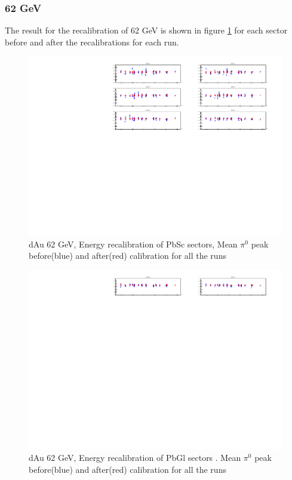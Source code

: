 \documentclass{article}
\begin{document}
\subsubsection{62 GeV}
The result for the recalibration of 62 GeV is shown in figure \ref{recalib62GeV} for each sector before and after the recalibrations for each run.
\begin{figure}
    \centering
    \includegraphics[width=1\textwidth]{fig_pi0vn/nocalib_vs_calib_sector1_6.pdf}
    \caption{dAu 62 GeV, Energy recalibration of PbSc sectors, Mean $\pi^{0}$ peak before(blue) and after(red) calibration for all the runs}
    \label{recalib62GeV}
\end{figure}
\begin{figure}
    \centering
    \includegraphics[width=1\textwidth]{fig_pi0vn/nocalib_vs_calib_sect7-8.pdf}
    \caption{dAu 62 GeV, Energy recalibration of PbGl sectors . Mean $\pi^{0}$ peak before(blue) and after(red) calibration for all the runs}
    \label{meanpi0vsrunsect67}
\end{figure}
\end{document}
